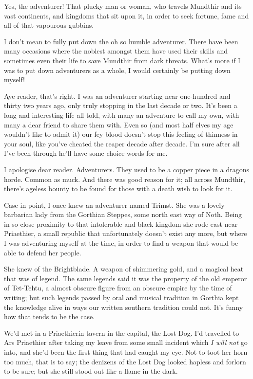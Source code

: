\documentclass[12pt, a4paper]{book}
\begin{document}
Yes, the adventurer! That plucky man or woman, who travels Mundthir and its vast continents, and kingdoms that sit upon it, in order to seek fortune, fame and all of that vapourous gubbins.

I don't mean to fully put down the oh so humble adventurer. There have been many occasions where the noblest amongst them have used their skills and sometimes even their life to save Mundthir from dark threats. What's more if I was to put down adventurers as a whole, I would certainly be putting down myself!

Aye reader, that's right. I was an adventurer starting near one-hundred and thirty two years ago, only truly stopping in the last decade or two. It's been a long and interesting life all told, with many an adventure to call my own, with many a dear friend to share them with. Even so (and most half elves my age wouldn't like to admit it) our fey blood doesn't stop this feeling of thinness in your soul, like you've cheated the reaper decade after decade. I'm sure after all I've been through he'll have some choice words for me.

I apologise dear reader. Adventurers. They used to be a copper piece in a dragons horde. Common as muck. And there was good reason for it; all across Mundthir, there's ageless bounty to be found for those with a death wish to look for it. 

Case in point, I once knew an adventurer named Trimst. She was a lovely barbarian lady from the Gorthian Steppes, some north east way of Noth. Being in so close proximity to that intolerable and black kingdom she rode east near Priaethier, a small republic that unfortunately doesn't exist any more, but where I was adventuring myself at the time, in order to find a weapon that would be able to defend her people.

She knew of the Brightblade. A weapon of shimmering gold, and a magical heat that was of legend. The same legends said it was the property of the old emperor of Tet-Tehtu, a almost obscure figure from an obscure empire by the time of writing; but such legends passed by oral and musical tradition in Gorthia kept the knowledge alive in ways our written southern tradition could not. It's funny how that tends to be the case.

We'd met in a Priaethierin tavern in the capital, the Lost Dog. I'd travelled to Ars Priaethier after taking my leave from some small incident which \textit{I will not} go into, and she'd been the first thing that had caught my eye. Not to toot her horn too much, that is to say; the denizens of the Lost Dog looked hapless and forlorn to be sure; but she still stood out like a flame in the dark.
\end{document}
